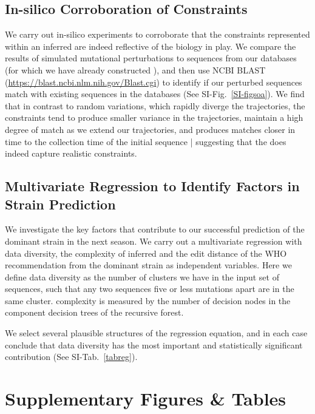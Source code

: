 \documentclass[onecolumn, compsoc,10pt]{IEEEtran}
\begin{document}
\subsection*{In-silico Corroboration of \qnet Constraints}

We carry out in-silico experiments to corroborate that the constraints represented within an inferred \qnet are indeed reflective of the  biology in play. We compare the results of simulated mutational perturbations to sequences from our databases (for which we have already constructed ), and then use NCBI BLAST (\href{https://blast.ncbi.nlm.nih.gov/Blast.cgi}{https://blast.ncbi.nlm.nih.gov/Blast.cgi}) to identify  if  our perturbed sequences match with existing sequences in the databases (See  SI-Fig.~\ref{SI-figsoa}). We find that in contrast to random variations, which rapidly diverge the trajectories, the \qnet constraints tend to produce smaller variance in the trajectories, maintain a high degree of match as we extend our trajectories, and produces matches closer in time to the collection time of the  initial sequence | suggesting that the \qnet  does indeed capture realistic constraints.









\subsection*{Multivariate Regression to Identify Factors in Strain Prediction}

We investigate the key factors that contribute to our successful prediction of the dominant strain in the next season. We carry out a multivariate regression with data diversity, the complexity of inferred \qnet and the edit distance of the WHO recommendation from the dominant strain as independent variables. Here we define data diversity as the number of clusters we have in the input set of sequences, such that any two sequences five or less mutations apart are in the same cluster. \qnet complexity is measured by the number of decision nodes in the component decision trees of the recursive forest.

We select several plausible structures of the regression equation, and in each case conclude that  data diversity has the most important and statistically significant contribution (See SI-Tab.~\ref{tabreg}).


\clearpage


\section*{Supplementary Figures \& Tables}


\end{document}
